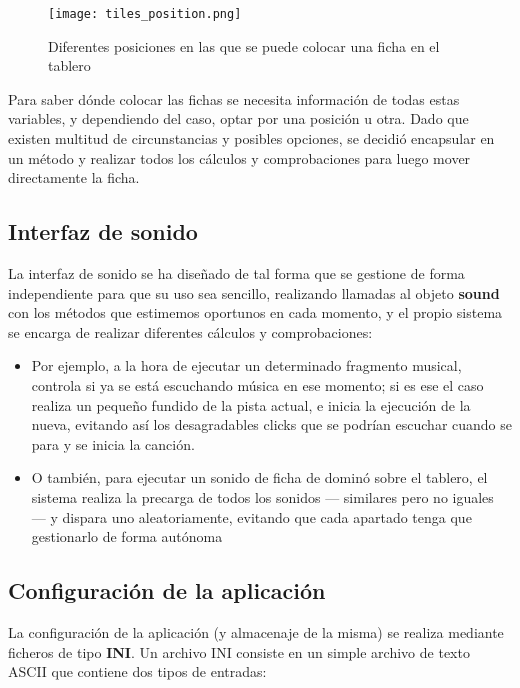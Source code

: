 \begin{figure}[h]
  \begin{center}
    \texttt{[image: tiles\_position.png]}
  \end{center}
  \caption{Diferentes posiciones en las que se puede colocar una ficha en el tablero}
  \label{fig:tiles-position}
\end{figure}

Para saber dónde colocar las fichas se necesita información de todas estas variables, y dependiendo del caso, optar por
una posición u otra. Dado que existen multitud de circunstancias y posibles opciones, se decidió encapsular en un método
y realizar todos los cálculos y comprobaciones para luego mover directamente la ficha.

\subsection{Interfaz de sonido}

La interfaz de sonido se ha diseñado de tal forma que se gestione de forma independiente para que su uso sea sencillo,
realizando llamadas al objeto \textbf{sound} con los métodos que estimemos oportunos en cada momento, y el propio
sistema se encarga de realizar diferentes cálculos y comprobaciones:

\begin{itemize} 
    \item Por ejemplo, a la hora de ejecutar un determinado fragmento musical, controla si ya se está escuchando música
        en ese momento; si es ese el caso realiza un pequeño fundido de la pista actual, e inicia la ejecución de la
        nueva, evitando así los desagradables clicks que se podrían escuchar cuando se para y se inicia la canción.
    \item O también, para ejecutar un sonido de ficha de dominó sobre el tablero, el sistema realiza la precarga de todos
        los sonidos --- similares pero no iguales --- y dispara uno aleatoriamente, evitando que cada apartado tenga
        que gestionarlo de forma autónoma
\end{itemize}


\subsection{Configuración de la aplicación}

La configuración de la aplicación (y almacenaje de la misma) se realiza mediante ficheros de tipo \textbf{INI}. Un archivo
INI consiste en un simple archivo de texto ASCII que contiene dos tipos de entradas:

